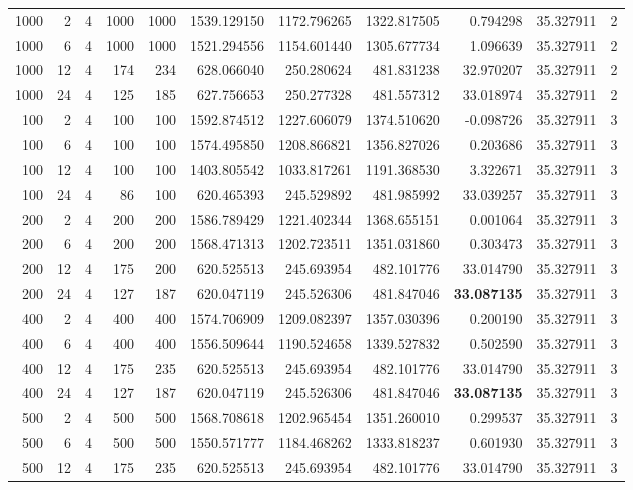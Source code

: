 \begin{table}
\begin{tabular}{rrrrrrrrrrr}
1000 & 2 & 4 & 1000 & 1000 & 1539.129150 & 1172.796265 & 1322.817505 & 0.794298 & 35.327911 & 2 \\
1000 & 6 & 4 & 1000 & 1000 & 1521.294556 & 1154.601440 & 1305.677734 & 1.096639 & 35.327911 & 2 \\
1000 & 12 & 4 & 174 & 234 & 628.066040 & 250.280624 & 481.831238 & 32.970207 & 35.327911 & 2 \\
1000 & 24 & 4 & 125 & 185 & 627.756653 & 250.277328 & 481.557312 & 33.018974 & 35.327911 & 2 \\
100 & 2 & 4 & 100 & 100 & 1592.874512 & 1227.606079 & 1374.510620 & -0.098726 & 35.327911 & 3 \\
100 & 6 & 4 & 100 & 100 & 1574.495850 & 1208.866821 & 1356.827026 & 0.203686 & 35.327911 & 3 \\
100 & 12 & 4 & 100 & 100 & 1403.805542 & 1033.817261 & 1191.368530 & 3.322671 & 35.327911 & 3 \\
100 & 24 & 4 & 86 & 100 & 620.465393 & 245.529892 & 481.985992 & 33.039257 & 35.327911 & 3 \\
200 & 2 & 4 & 200 & 200 & 1586.789429 & 1221.402344 & 1368.655151 & 0.001064 & 35.327911 & 3 \\
200 & 6 & 4 & 200 & 200 & 1568.471313 & 1202.723511 & 1351.031860 & 0.303473 & 35.327911 & 3 \\
200 & 12 & 4 & 175 & 200 & 620.525513 & 245.693954 & 482.101776 & 33.014790 & 35.327911 & 3 \\
200 & 24 & 4 & 127 & 187 & 620.047119 & 245.526306 & 481.847046 & \textbf{33.087135} & 35.327911 & 3 \\
400 & 2 & 4 & 400 & 400 & 1574.706909 & 1209.082397 & 1357.030396 & 0.200190 & 35.327911 & 3 \\
400 & 6 & 4 & 400 & 400 & 1556.509644 & 1190.524658 & 1339.527832 & 0.502590 & 35.327911 & 3 \\
400 & 12 & 4 & 175 & 235 & 620.525513 & 245.693954 & 482.101776 & 33.014790 & 35.327911 & 3 \\
400 & 24 & 4 & 127 & 187 & 620.047119 & 245.526306 & 481.847046 & \textbf{33.087135} & 35.327911 & 3 \\
500 & 2 & 4 & 500 & 500 & 1568.708618 & 1202.965454 & 1351.260010 & 0.299537 & 35.327911 & 3 \\
500 & 6 & 4 & 500 & 500 & 1550.571777 & 1184.468262 & 1333.818237 & 0.601930 & 35.327911 & 3 \\
500 & 12 & 4 & 175 & 235 & 620.525513 & 245.693954 & 482.101776 & 33.014790 & 35.327911 & 3 \\

\end{tabular}
\end{table}
